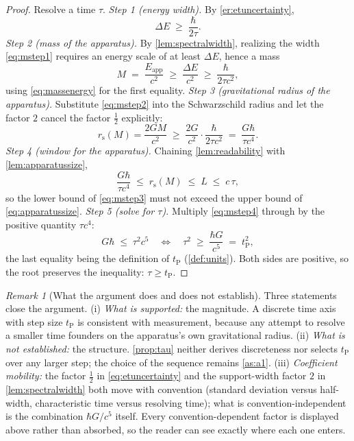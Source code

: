 \documentclass[11pt]{amsbook}
\theoremstyle{plain}
\theoremstyle{definition}
\theoremstyle{remark}
\newtheorem{remark}[theorem]{Remark}
\begin{document}
\begin{proof}
Resolve a time $\tau$. \emph{Step 1 (energy width).} By \cref{er:etuncertainty},
\begin{equation}\label{eq:mstep1}
\Delta E \;\geq\; \frac{\hbar}{2\tau}.
\end{equation}
\emph{Step 2 (mass of the apparatus).} By \cref{lem:spectralwidth}, realizing the width \cref{eq:mstep1} requires an energy scale of at least $\Delta E$, hence a mass
\begin{equation}\label{eq:mstep2}
M \;=\; \frac{E_{\mathrm{app}}}{c^{2}} \;\geq\; \frac{\Delta E}{c^{2}} \;\geq\; \frac{\hbar}{2 \tau c^{2}},
\end{equation}
using \cref{eq:massenergy} for the first equality.
\emph{Step 3 (gravitational radius of the apparatus).} Substitute \cref{eq:mstep2} into the Schwarzschild radius and let the factor $2$ cancel the factor $\tfrac12$ explicitly:
\begin{equation}\label{eq:mstep3}
r_{\mathrm s}(M) = \frac{2 G M}{c^{2}} \;\geq\; \frac{2 G}{c^{2}}\cdot\frac{\hbar}{2 \tau c^{2}} \;=\; \frac{G \hbar}{\tau c^{4}}.
\end{equation}
\emph{Step 4 (window for the apparatus).} Chaining \cref{lem:readability} with \cref{lem:apparatussize},
\begin{equation}\label{eq:mstep4}
\frac{G \hbar}{\tau c^{4}} \;\leq\; r_{\mathrm s}(M) \;\leq\; L \;\leq\; c\,\tau,
\end{equation}
so the lower bound of \cref{eq:mstep3} must not exceed the upper bound of \cref{eq:apparatussize}.
\emph{Step 5 (solve for $\tau$).} Multiply \cref{eq:mstep4} through by the positive quantity $\tau c^{4}$:
\begin{equation}\label{eq:mstep5}
G \hbar \;\leq\; \tau^{2} c^{5}
\quad\Longleftrightarrow\quad
\tau^{2} \;\geq\; \frac{\hbar G}{c^{5}} \;=\; t_{\mathrm P}^{2},
\end{equation}
the last equality being the definition of $t_{\mathrm P}$ (\cref{def:units}). Both sides are positive, so the root preserves the inequality: $\tau \geq t_{\mathrm P}$.
\end{proof}

\begin{remark}[What the argument does and does not establish]\label{rem:license}
Three statements close the argument. (i) \emph{What is supported:} the magnitude. A discrete time axis with step size $t_{\mathrm P}$ is consistent with measurement, because any attempt to resolve a smaller time founders on the apparatus's own gravitational radius. (ii) \emph{What is not established:} the structure. \cref{prop:tau} neither derives discreteness nor selects $t_{\mathrm P}$ over any larger step; the choice of the sequence remains \cref{as:a1}. (iii) \emph{Coefficient mobility:} the factor $\tfrac12$ in \cref{eq:etuncertainty} and the support-width factor $2$ in \cref{lem:spectralwidth} both move with convention (standard deviation versus half-width, characteristic time versus resolving time); what is convention-independent is the combination $\hbar G / c^{5}$ itself. Every convention-dependent factor is displayed above rather than absorbed, so the reader can see exactly where each one enters.
\end{remark}
\end{document}
